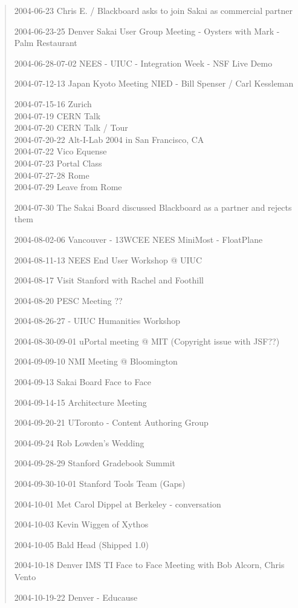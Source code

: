 \begin{quote}
2004-06-23 Chris E. / Blackboard asks to join Sakai as commercial partner

2004-06-23-25 Denver Sakai User Group Meeting - Oysters with Mark - Palm Restaurant

2004-06-28-07-02 NEES - UIUC - Integration Week - NSF Live Demo

2004-07-12-13 Japan Kyoto Meeting NIED - Bill Spenser / Carl Kessleman

2004-07-15-16 Zurich\\
2004-07-19 CERN Talk\\
2004-07-20 CERN Talk / Tour\\
2004-07-20-22 Alt-I-Lab 2004 in San Francisco, CA\\
2004-07-22 Vico Equense\\
2004-07-23 Portal Class\\
2004-07-27-28 Rome\\
2004-07-29 Leave from Rome

2004-07-30 The Sakai Board discussed Blackboard as a partner and rejects them

2004-08-02-06 Vancouver - 13WCEE NEES MiniMost - FloatPlane

2004-08-11-13 NEES End User Workshop @ UIUC

2004-08-17 Visit Stanford with Rachel and Foothill

2004-08-20 PESC Meeting ??

2004-08-26-27 - UIUC Humanities Workshop

2004-08-30-09-01 uPortal meeting @ MIT  (Copyright issue with JSF??)

2004-09-09-10 NMI Meeting @ Bloomington

2004-09-13 Sakai Board Face to Face

2004-09-14-15 Architecture Meeting

2004-09-20-21 UToronto - Content Authoring Group

2004-09-24 Rob Lowden's Wedding

2004-09-28-29 Stanford Gradebook Summit

2004-09-30-10-01 Stanford Tools Team (Gaps)

2004-10-01 Met Carol Dippel at Berkeley - conversation

2004-10-03 Kevin Wiggen of Xythos

2004-10-05 Bald Head (Shipped 1.0)

2004-10-18 Denver IMS TI Face to Face Meeting with Bob Alcorn, Chris Vento

2004-10-19-22 Denver  - Educause 


\end{quote}
